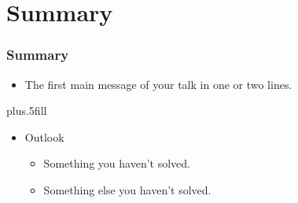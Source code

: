 \documentclass{beamer}
\begin{document}



\section*{Summary}

\begin{frame}
\frametitle<presentation>{Summary}

\begin{itemize}
  \item The \alert{first main message} of your talk in one or two lines.
\end{itemize}




\vskip0pt plus.5fill
\begin{itemize}
  \item Outlook
  \begin{itemize}
    \item Something you haven't solved.
    \item Something else you haven't solved.
  \end{itemize}
\end{itemize}
\end{frame}
\end{document}
